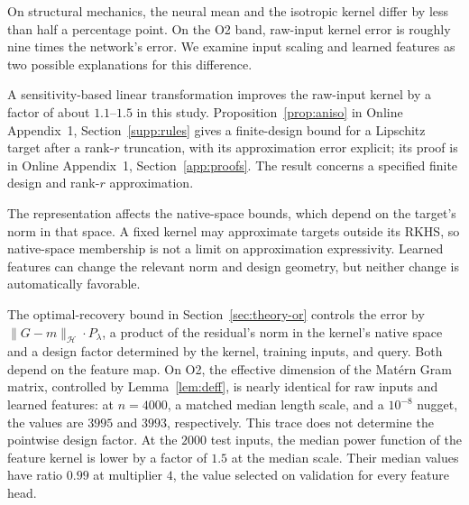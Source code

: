 \documentclass[twoside,11pt]{article}
\newcommand{\alignDeffRaw}{3995}        %
\newcommand{\alignDeffFeat}{3993}       %
\newcommand{\alignRatioP}{1.5}          %
\newcommand{\alignRatioPSel}{0.99}   %
\begin{document}
On structural mechanics, the neural mean and the isotropic kernel differ by
less than half a percentage point. On the O2 band, raw-input kernel error is
roughly nine times the network's error. We examine input scaling and learned
features as two possible explanations for this difference.

A sensitivity-based linear transformation improves the raw-input kernel by a factor of about $1.1$--$1.5$ in this study. Proposition~\ref{prop:aniso} in Online Appendix~1, Section~\ref{supp:rules} gives a finite-design bound for a Lipschitz target after a rank-$r$ truncation, with its approximation error explicit; its proof is in Online Appendix~1, Section~\ref{app:proofs}. The result concerns a specified finite design and rank-$r$ approximation.

The representation affects the native-space bounds, which depend on the target's norm in that space. A fixed kernel may approximate targets outside its RKHS, so native-space membership is not a limit on approximation expressivity. Learned features can change the relevant norm and design geometry, but neither change is automatically favorable.

The optimal-recovery bound in Section~\ref{sec:theory-or}
controls the error by $\|G-m\|_{\mathcal H}\cdot P_\lambda$, a product of
the residual's norm in the kernel's native space and a design factor
determined by the kernel, training inputs, and query. Both depend on the
feature map. On O2, the effective dimension of the Mat\'ern Gram matrix,
controlled by Lemma~\ref{lem:deff}, is nearly identical for raw inputs
and learned features: at $n=4000$, a matched median length scale, and a
$10^{-8}$ nugget, the values are $\alignDeffRaw$ and $\alignDeffFeat$,
respectively. This trace does not determine the pointwise design factor.
At the $2000$ test inputs, the median power function of the feature kernel
is lower by a factor of $\alignRatioP$ at the median scale. Their median
values have ratio $\alignRatioPSel$ at multiplier $4$, the value
selected on validation for every feature head.
\end{document}
